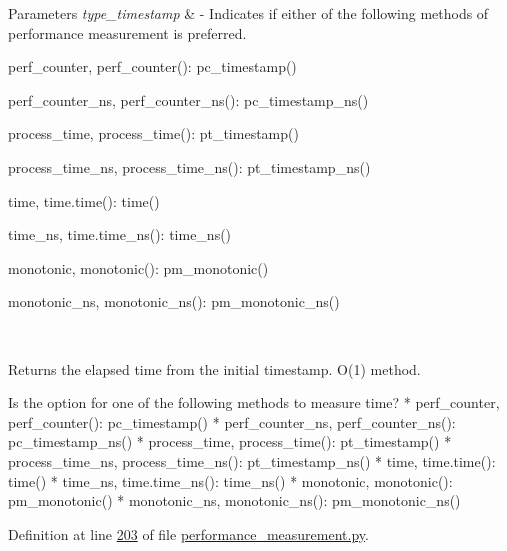 \begin{DoxyParams}{Parameters}
{\em type\+\_\+timestamp} & -\/ Indicates if either of the following methods of performance measurement is preferred.
\begin{DoxyItemize}
\item perf\+\_\+counter, perf\+\_\+counter()\+: pc\+\_\+timestamp()
\item perf\+\_\+counter\+\_\+ns, perf\+\_\+counter\+\_\+ns()\+: pc\+\_\+timestamp\+\_\+ns()
\item process\+\_\+time, process\+\_\+time()\+: pt\+\_\+timestamp()
\item process\+\_\+time\+\_\+ns, process\+\_\+time\+\_\+ns()\+: pt\+\_\+timestamp\+\_\+ns()
\item time, time.\+time()\+: time()
\item time\+\_\+ns, time.\+time\+\_\+ns()\+: time\+\_\+ns()
\item monotonic, monotonic()\+: pm\+\_\+monotonic()
\item monotonic\+\_\+ns, monotonic\+\_\+ns()\+: pm\+\_\+monotonic\+\_\+ns() 
\end{DoxyItemize}\\
\hline
\end{DoxyParams}
\begin{DoxyReturn}{Returns}
the elapsed time from the initial timestamp. O(1) method. \begin{DoxyVerb}    Is the option for one of the following methods to measure
time?
* perf_counter, perf_counter(): pc_timestamp()
* perf_counter_ns, perf_counter_ns(): pc_timestamp_ns()
* process_time, process_time(): pt_timestamp()
* process_time_ns, process_time_ns(): pt_timestamp_ns()
* time, time.time(): time()
* time_ns, time.time_ns(): time_ns()
* monotonic, monotonic(): pm_monotonic()
* monotonic_ns, monotonic_ns(): pm_monotonic_ns()
\end{DoxyVerb}
 
\end{DoxyReturn}


Definition at line \hyperlink{performance__measurement_8py_source_l00203}{203} of file \hyperlink{performance__measurement_8py_source}{performance\+\_\+measurement.\+py}.


